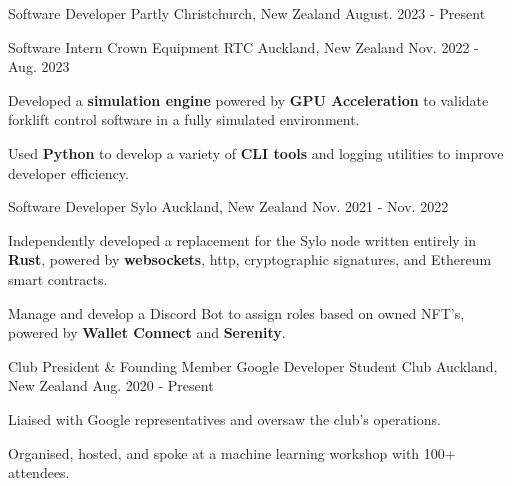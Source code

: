 
\begin{cventries}
  \cventry
    {Software Developer}
    {Partly}
    {Christchurch, New Zealand}
    {August. 2023 - Present}
    {
    }

  \cventry
    {Software Intern}
    {Crown Equipment RTC}
    {Auckland, New Zealand}
    {Nov. 2022 - Aug. 2023}
    {
      \begin{cvitems}
        \item {Developed a \textbf{simulation engine} powered by \textbf{GPU Acceleration} to validate forklift control software in a fully simulated environment.}
        \item {Used \textbf{Python} to develop a variety of \textbf{CLI tools} and logging utilities to improve developer efficiency.}
      \end{cvitems}
    }

  \cventry
    {Software Developer} %
    {Sylo} %
    {Auckland, New Zealand} %
    {Nov. 2021 - Nov. 2022} %
    {
      \begin{cvitems} %
        \item {Independently developed a replacement for the Sylo node written entirely in \textbf{Rust}, powered by \textbf{websockets}, http, cryptographic signatures, and Ethereum smart contracts.}
        \item {Manage and develop a Discord Bot to assign roles based on owned NFT's, powered by \textbf{Wallet Connect} and \textbf{Serenity}.}
      \end{cvitems}
    }

  \cventry
    {Club President \& Founding Member} %
    {Google Developer Student Club} %
    {Auckland, New Zealand} %
    {Aug. 2020 - Present} %
    {
      \begin{cvitems} %
        \item {Liaised with Google representatives and oversaw the club's operations.}
        \item {Organised, hosted, and spoke at a machine learning workshop with 100+ attendees.}
      \end{cvitems}
    }


\end{cventries}
